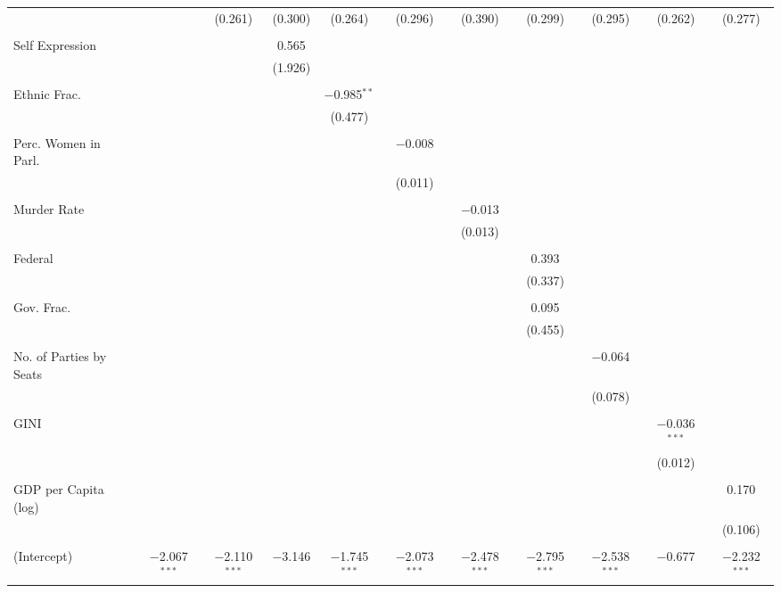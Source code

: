 \documentclass[a4paper]{article}\usepackage[]{graphicx}\usepackage[]{color}
\begin{document}
\begin{table}
\begin{center}
{\begin{tabular}{@{\extracolsep{5pt}}lcccccccccc}
  &  & (0.261) & (0.300) & (0.264) & (0.296) & (0.390) & (0.299) & (0.295) & (0.262) & (0.277) \\ 
  & & & & & & & & & & \\ 
 Self Expression &  &  & 0.565 &  &  &  &  &  &  &  \\ 
  &  &  & (1.926) &  &  &  &  &  &  &  \\ 
  & & & & & & & & & & \\ 
 Ethnic Frac. &  &  &  & $-$0.985$^{**}$ &  &  &  &  &  &  \\ 
  &  &  &  & (0.477) &  &  &  &  &  &  \\ 
  & & & & & & & & & & \\ 
 Perc. Women in Parl. &  &  &  &  & $-$0.008 &  &  &  &  &  \\ 
  &  &  &  &  & (0.011) &  &  &  &  &  \\ 
  & & & & & & & & & & \\ 
 Murder Rate &  &  &  &  &  & $-$0.013 &  &  &  &  \\ 
  &  &  &  &  &  & (0.013) &  &  &  &  \\ 
  & & & & & & & & & & \\ 
 Federal &  &  &  &  &  &  & 0.393 &  &  &  \\ 
  &  &  &  &  &  &  & (0.337) &  &  &  \\ 
  & & & & & & & & & & \\ 
 Gov. Frac. &  &  &  &  &  &  & 0.095 &  &  &  \\ 
  &  &  &  &  &  &  & (0.455) &  &  &  \\ 
  & & & & & & & & & & \\ 
 No. of Parties by Seats &  &  &  &  &  &  &  & $-$0.064 &  &  \\ 
  &  &  &  &  &  &  &  & (0.078) &  &  \\ 
  & & & & & & & & & & \\ 
 GINI &  &  &  &  &  &  &  &  & $-$0.036$^{***}$ &  \\ 
  &  &  &  &  &  &  &  &  & (0.012) &  \\ 
  & & & & & & & & & & \\ 
 GDP per Capita (log) &  &  &  &  &  &  &  &  &  & 0.170 \\ 
  &  &  &  &  &  &  &  &  &  & (0.106) \\ 
  & & & & & & & & & & \\ 
 (Intercept) & $-$2.067$^{***}$ & $-$2.110$^{***}$ & $-$3.146 & $-$1.745$^{***}$ & $-$2.073$^{***}$ & $-$2.478$^{***}$ & $-$2.795$^{***}$ & $-$2.538$^{***}$ & $-$0.677 & $-$2.232$^{***}$ \\ 

\end{tabular}}
\end{center}
\end{table}
\end{document}
